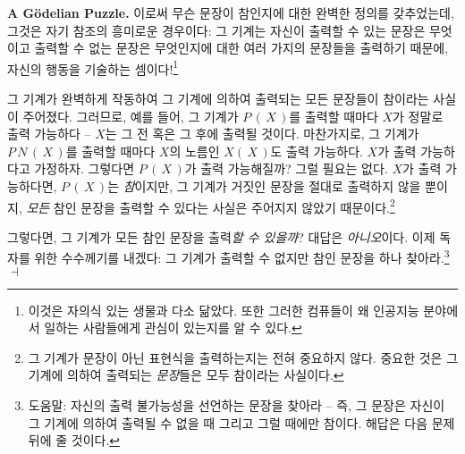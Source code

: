 \documentclass[12pt]{paper}
\newenvironment{context}[1][]{\noindent \textbf{{#1}.}}{\hfill $ \dashv $}
\begin{document}
\begin{context}[A G\"odelian Puzzle]
    이로써 무슨 문장이 참인지에 대한 완벽한 정의를 갖추었는데,
    그것은 자기 참조의 흥미로운 경우이다:
    그 기계는 자신이 출력할 수 있는 문장은 무엇이고 출력할 수 없는 문장은 무엇인지에 대한 여러 가지의 문장들을 출력하기 때문에,
    자신의 행동을 기술하는 셈이다!\footnote
    {
      이것은 자의식 있는 생물과 다소 닮았다.
      또한 그러한 컴퓨들이 왜 인공지능 분야에서 일하는 사람들에게 관심이 있는지를 알 수 있다.
    }

    그 기계가 완벽하게 작동하여 그 기계에 의하여 출력되는 모든 문장들이 참이라는 사실이 주어졌다.
    그러므로, 예를 들어, 그 기계가 $P \, \left( \, X \, \right)$를 출력할 때마다 $X$가 정말로 출력 가능하다 --
    $X$는 그 전 혹은 그 후에 출력될 것이다.
    마찬가지로, 그 기계가 $P \, N \, \left( \, X \, \right)$를 출력할 때마다 $X$의 노름인 $X \left( \, X \, \right)$도 출력 가능하다.
    $X$가 출력 가능하다고 가정하자.
    그렇다면 $P \, \left( \, X \, \right)$가 출력 가능해질까?
    그럴 필요는 없다.
    $X$가 출력 가능하다면, $P \, \left( \, X \, \right)$는 \textit{참}이지만,
    그 기계가 거짓인 문장을 절대로 출력하지 않을 뿐이지,
    \textit{모든} 참인 문장을 출력할 수 있다는 사실은 주어지지 않았기 때문이다.\footnote
    {
      그 기계가 문장이 아닌 표현식을 출력하는지는 전혀 중요하지 않다.
      중요한 것은 그 기계에 의하여 출력되는 \textit{문장}들은 모두 참이라는 사실이다.
    }

    그렇다면, 그 기계가 모든 참인 문장을 출력\textit{할 수 있을까}?
    대답은 \textit{아니오}이다.
    이제 독자를 위한 수수께기를 내겠다:
    그 기계가 출력할 수 없지만 참인 문장을 하나 찾아라.\footnote
    {
      도움말: 자신의 출력 불가능성을 선언하는 문장을 찾아라 --
      즉, 그 문장은 자신이 그 기계에 의하여 출력될 수 없을 때 그리고 그럴 때에만 참이다.
      해답은 다음 문제 뒤에 줄 것이다.
    }
  \end{context}
\end{document}
